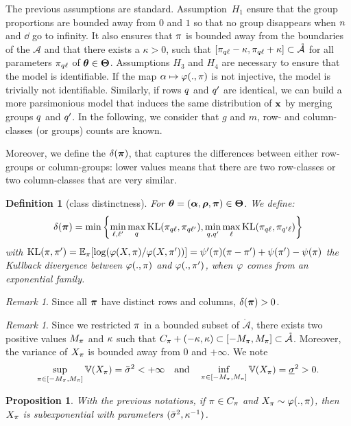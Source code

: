 \documentclass[bj]{imsart}
\numberwithin{equation}{section}
\theoremstyle{plain}
\newtheorem{dof}[thm]{Definition}
\newtheorem{proposition}[thm]{Proposition}
\theoremstyle{remark}
\newtheorem{rem}[thm]{Remark}
\begin{document}
The previous assumptions are standard. Assumption~$H_1$ ensure that the group proportions are bounded away from $0$ and $1$ so that no group disappears when $n$ and $\dd$ go to infinity. It also ensures that $\pi$ is bounded away from the boundaries of the $\mathcal{A}$ and that there exists a $\kappa>0$, such that $[\pi_{q\ell} - \kappa, \pi_{q\ell} + \kappa] \subset \mathring{\mathcal{A}}$ for all parameters $\pi_{q\ell}$ of $\boldsymbol{\theta} \in \boldsymbol{\Theta}$. Assumptions $H_3$ and $H_4$ are necessary to ensure that the model is identifiable. If the map $\alpha \mapsto \varphi(., \pi)$ is not injective, the model is trivially not identifiable. Similarly, if rows $q$ and $q'$ are identical, we can build a more parsimonious model that induces the same distribution of $\mathbf{x}$ by merging groups $q$ and $q'$. In the following, we  consider that $g$ and $m$, row- and column- classes (or groups) counts are known.

Moreover, we define the $ \delta(\boldsymbol{\pi})$, that captures the differences between either row-groups or column-groups: lower values means that there are two row-classes or two column-classes that are very similar. 
\begin{dof}[class distinctness]
  \label{def:group-distinctness}
  For $\boldsymbol{\theta} = (\boldsymbol{\alpha}, \boldsymbol{\rho}, \boldsymbol{\pi}) \in \boldsymbol{\Theta}$. We define:
  \begin{equation*}
    \delta(\bal) = \min\left\{ \min_{\el, \lp} \max_{\kk} \KL(\alkl, \al_{\kk\lp}), \min_{\kk, \kp} \max_{\el} \KL(\alkl, \al_{\kp\el}) \right\}
  \end{equation*}
  with $\operatorname{KL}(\pi,\pi') = \mathbb{E}_{\pi}[\log(\varphi(X, \pi)/\varphi(X, \pi'))]=\psi'(\pi) (\pi - \pi') + \psi(\pi') - \psi(\pi)$ the Kullback divergence between $\varphi(., \pi)$ and $\varphi(., \pi')$, when $\varphi$ comes from an exponential family.
\end{dof}
\begin{rem}
Since all $\boldsymbol{\pi}$ have distinct rows and columns, $\delta(\boldsymbol{\pi}) > 0$.
\end{rem}

\begin{rem}
Since we restricted $\pi$ in a bounded subset of $\mathring{\mathcal{A}}$, there exists two positive values $M_{\pi}$ and $\kappa$ such that $C_\pi + (-\kappa, \kappa) \subset [-M_{\pi}, M_\pi] \subset \mathring{\mathcal{A}}$. Moreover, the variance of $X_{\pi}$ is bounded away from $0$ and $+\infty$. We note
\begin{equation}
  \label{eq:condition-variance}
  \sup_{\al \in [-M_{\al}, M_{\al}] } \Var(\X_\al) = \vmax^2 < +\infty \quad \text{and} \quad \inf_{\al \in [-M_{\al}, M_{\al}]} \Var(\X_\al) = \vmin^2 > 0.
\end{equation}
\end{rem}
\begin{proposition}
With the previous notations, if $\pi \in C_\pi$ and $X_{\pi} \sim \varphi(., \pi)$, then $X_\pi$ is subexponential with parameters $(\bar{\sigma}^2, \kappa^{-1})$.
\end{proposition}
\end{document}
